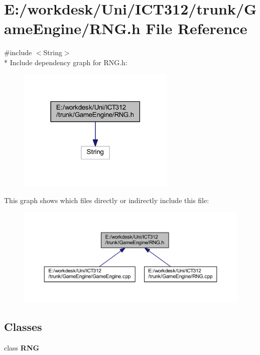 \section{E\+:/workdesk/\+Uni/\+I\+C\+T312/trunk/\+Game\+Engine/\+R\+N\+G.h File Reference}
\label{_r_n_g_8h}
{\ttfamily \#include $<$String$>$}\\*
Include dependency graph for R\+N\+G.\+h\+:\nopagebreak
\begin{figure}[H]
\begin{center}
\leavevmode
\includegraphics[width=213pt]{d8/d05/_r_n_g_8h__incl}
\end{center}
\end{figure}
This graph shows which files directly or indirectly include this file\+:\nopagebreak
\begin{figure}[H]
\begin{center}
\leavevmode
\includegraphics[width=350pt]{d9/d01/_r_n_g_8h__dep__incl}
\end{center}
\end{figure}
\subsection*{Classes}
\begin{DoxyCompactItemize}
\item 
class {\bf R\+N\+G}
\end{DoxyCompactItemize}
